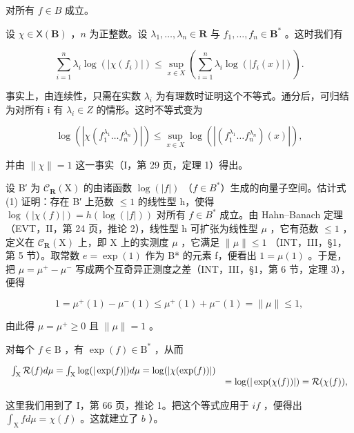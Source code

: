 对所有 \(f \in B\) 成立。

设 \(\chi \in \mathsf{X}(\mathbf{B})\) ，\(n\) 为正整数。设 \(\lambda_1, \ldots, \lambda_n \in \mathbf{R}\) 与 \(f_1, \ldots, f_n \in \mathbf{B}^*\) 。这时我们有

\[
\sum_ {i = 1} ^ {n} \lambda_ {i} \log (| \chi (f _ {i}) |) \leqslant \sup _ {x \in X} \left(\sum_ {i = 1} ^ {n} \lambda_ {i} \log (| f _ {i} (x) |)\right).\tag{1}
\]

事实上，由连续性，只需在实数 \(\lambda_{i}\) 为有理数时证明这个不等式。通分后，可归结为对所有 i 有 \(\lambda_{i} \in Z\) 的情形。这时不等式变为

\[
\log \left(\left| \chi \left(f _ {1} ^ {\lambda_ {1}} \dots f _ {n} ^ {\lambda_ {n}}\right) \right|\right) \leqslant \sup _ {x \in X} \log \left(\left| \left(f _ {1} ^ {\lambda_ {1}} \dots f _ {n} ^ {\lambda_ {n}}\right) (x) \right|\right),
\]

并由 \(\|\chi\|=1\) 这一事实（I，第 29 页，定理 1）得出。

设 B′ 为 \(\mathcal{C}_{\mathbf{R}}(\mathrm{X})\) 的由诸函数 \(\log(|f|)\) （\(f \in B^{*}\)）生成的向量子空间。估计式 (1) 证明：存在 B′ 上范数 \(\leqslant 1\) 的线性型 h，使得 \(\log(|\chi(f)|) = h(\log(|f|))\) 对所有 \(f \in B^{*}\) 成立。由 Hahn–Banach 定理（EVT，II，第 24 页，推论 2），线性型 h 可扩张为线性型 \(\mu\) ，它有范数 \(\leqslant 1\) ，定义在 \(\mathcal{C}_{\mathbf{R}}(\mathrm{X})\) 上，即 X 上的实测度 \(\mu\) ，它满足 \(\|\mu\| \leqslant 1\) （INT，III，§1，第 5 节）。取常数 \(e = \exp(1)\) 作为 B* 的元素 f，便看出 \(1 = \mu(1)\) 。于是，把 \(\mu = \mu^{+} - \mu^{-}\) 写成两个互奇异正测度之差（INT，III，§1，第 6 节，定理 3），便得

\[
1 = \mu^ {+} (1) - \mu^ {-} (1) \leqslant \mu^ {+} (1) + \mu^ {-} (1) = \| \mu \| \leqslant 1,
\]

由此得 \(\mu = \mu^{+} \geqslant 0\) 且 \(\|\mu\| = 1\) 。

对每个 \(f \in \mathrm{B}\) ，有 \(\exp(f) \in \mathrm{B}^*\) ，从而

\[
\begin{array}{r l} \int_ {\mathrm{X}} \mathcal {R} (f) d \mu = \int_ {\mathrm{X}} \log (| \exp (f) |) d \mu = \log (| \chi (\exp (f)) |) \\ & = \log (| \exp (\chi (f)) |) = \mathcal {R} (\chi (f)), \end{array}
\]

这里我们用到了 I，第 66 页，推论 1。把这个等式应用于 \(if\) ，便得出 \(\int_{\mathrm{X}} f d\mu = \chi(f)\) 。这就建立了 \(b\) ）。

